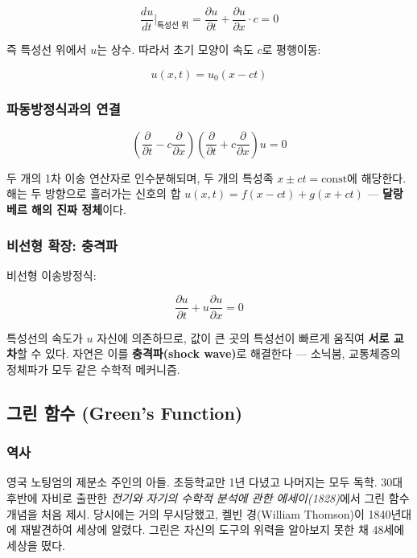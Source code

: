 \documentclass[11pt,a4paper]{article}
\begin{document}
\begin{equation}
\frac{du}{dt}\bigg|_{\text{특성선 위}} = \frac{\partial u}{\partial t} + \frac{\partial u}{\partial x}\cdot c = 0
\end{equation}

즉 특성선 위에서 $u$는 상수. 따라서 초기 모양이 속도 $c$로 평행이동:

\begin{equation}
u(x, t) = u_0(x - ct)
\end{equation}

\subsubsection{파동방정식과의 연결}

\begin{equation}
\left(\frac{\partial}{\partial t} - c\frac{\partial}{\partial x}\right)\left(\frac{\partial}{\partial t} + c\frac{\partial}{\partial x}\right)u = 0
\end{equation}

두 개의 1차 이송 연산자로 인수분해되며, 두 개의 특성족 $x \pm ct = \text{const}$에 해당한다. 해는 두 방향으로 흘러가는 신호의 합 $u(x, t) = f(x - ct) + g(x + ct)$ --- \textbf{달랑베르 해의 진짜 정체}이다.

\subsubsection{비선형 확장: 충격파}

비선형 이송방정식:

\begin{equation}
\frac{\partial u}{\partial t} + u\frac{\partial u}{\partial x} = 0
\end{equation}

특성선의 속도가 $u$ 자신에 의존하므로, 값이 큰 곳의 특성선이 빠르게 움직여 \textbf{서로 교차}할 수 있다. 자연은 이를 \textbf{충격파(shock wave)}로 해결한다 --- 소닉붐, 교통체증의 정체파가 모두 같은 수학적 메커니즘.

\subsection{그린 함수 (Green's Function)}

\subsubsection{역사}

\begin{historybox}
영국 노팅엄의 제분소 주인의 아들. 초등학교만 1년 다녔고 나머지는 모두 독학. 30대 후반에 자비로 출판한 \emph{전기와 자기의 수학적 분석에 관한 에세이(1828)}에서 그린 함수 개념을 처음 제시. 당시에는 거의 무시당했고, 켈빈 경(William Thomson)이 1840년대에 재발견하여 세상에 알렸다. 그린은 자신의 도구의 위력을 알아보지 못한 채 48세에 세상을 떴다.
\end{historybox}
\end{document}
